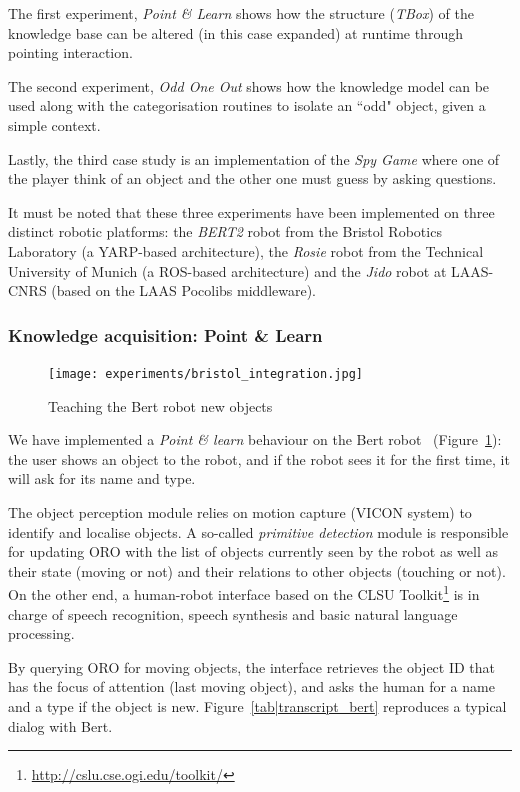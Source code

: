The first experiment, \emph{Point \& Learn} shows how the structure
(\emph{TBox}) of the knowledge base can be altered (in this case expanded) at
runtime through pointing interaction.

The second experiment, \emph{Odd One Out} shows how the knowledge model can be
used along with the categorisation routines to isolate an ``odd" object, given
a simple context.

Lastly, the third case study is an implementation of the \emph{Spy Game} where
one of the player think of an object and the other one must guess by asking
questions.

It must be noted that these three experiments have been implemented on three
distinct robotic platforms: the \textit{BERT2} robot from the Bristol Robotics
Laboratory (a YARP-based architecture), the \textit{Rosie} robot from the
Technical University of Munich (a ROS-based architecture) and the \textit{Jido}
robot at LAAS-CNRS (based on the LAAS Pocolibs middleware).

\subsubsection{Knowledge acquisition: Point \& Learn}
\label{expe|pointandlearn}

\begin{figure}
\centering

\centering
  \texttt{[image: experiments/bristol\_integration.jpg]}
  \caption{Teaching the Bert robot new objects}
  \label{fig|bristol}

\end{figure}

We have implemented a \textit{Point \& learn} behaviour on the Bert
robot~\cite{Lallee2010b} (Figure~\ref{fig|bristol}): the user shows an object
to the robot, and if the robot sees it for the first time, it will ask for its
name and type.

The object perception module relies on motion capture (VICON system) to
identify and localise objects. A so-called \textit{primitive detection} module
is responsible for updating ORO with the list of objects currently seen by the
robot as well as their state (moving or not) and their relations to other
objects (touching or not). On the other end, a human-robot interface based on
the CLSU Toolkit\footnote{\url{http://cslu.cse.ogi.edu/toolkit/}} is in charge
of speech recognition, speech synthesis and basic natural language processing.

By querying ORO for moving objects, the interface retrieves the object ID that
has the focus of attention (last moving object), and asks the human for a name
and a type if the object is new. Figure~\ref{tab|transcript_bert} reproduces a
typical dialog with Bert.

